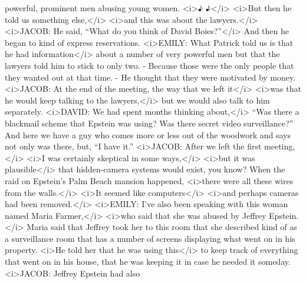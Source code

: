 \begin{itemize}
  powerful, prominent men abusing young women.
  \textless{}i\textgreater{}♪ ♪\textless{}/i\textgreater{}
  \textless{}i\textgreater{}But then he told us something
  else,\textless{}/i\textgreater{} \textless{}i\textgreater{}and this
  was about the lawyers.\textless{}/i\textgreater{}
  \textless{}i\textgreater{}JACOB: He said, ``What do you think of David
  Boies?''\textless{}/i\textgreater{} And then he began to kind of
  express reservations. \textless{}i\textgreater{}EMILY: What Patrick
  told us is that he had information\textless{}/i\textgreater{} about a
  number of very powerful men but that the lawyers told him to stick to
  only two. - Because those were the only people that they wanted out at
  that time. - He thought that they were motivated by money.
  \textless{}i\textgreater{}JACOB: At the end of the meeting, the way
  that we left it\textless{}/i\textgreater{}
  \textless{}i\textgreater{}was that he would keep talking to the
  lawyers,\textless{}/i\textgreater{} but we would also talk to him
  separately. \textless{}i\textgreater{}DAVID: We had spent months
  thinking about,\textless{}/i\textgreater{} ``Was there a blackmail
  scheme that Epstein was using? Was there secret video surveillance?''
  And here we have a guy who comes more or less out of the woodwork and
  says not only was there, but, ``I have it.''
  \textless{}i\textgreater{}JACOB: After we left the first
  meeting,\textless{}/i\textgreater{} \textless{}i\textgreater{}I was
  certainly skeptical in some ways,\textless{}/i\textgreater{}
  \textless{}i\textgreater{}but it was
  plausible\textless{}/i\textgreater{} that hidden-camera systems would
  exist, you know? When the raid on Epstein's Palm Beach mansion
  happened, \textless{}i\textgreater{}there were all these wires from
  the walls.\textless{}/i\textgreater{} \textless{}i\textgreater{}It
  seemed like computers\textless{}/i\textgreater{}
  \textless{}i\textgreater{}and perhaps cameras had been
  removed.\textless{}/i\textgreater{} \textless{}i\textgreater{}EMILY:
  I've also been speaking with this woman named Maria
  Farmer,\textless{}/i\textgreater{} \textless{}i\textgreater{}who said
  that she was abused by Jeffrey Epstein.\textless{}/i\textgreater{}
  Maria said that Jeffrey took her to this room that she described kind
  of as a surveillance room that has a number of screens displaying what
  went on in his property. \textless{}i\textgreater{}He told her that he
  was using this\textless{}/i\textgreater{} to keep track of everything
  that went on in his house, that he was keeping it in case he needed it
  someday. \textless{}i\textgreater{}JACOB: Jeffrey Epstein had also

\end{itemize}
